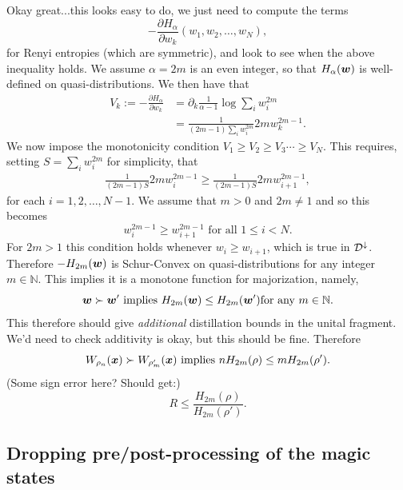 \documentclass[pra,
aps,
twocolumn,
superscriptaddress,
groupedaddress,
nofootinbib,
reprint
]{revtex4-1}
\begin{document}
 Okay great...this looks easy to do, we just need to compute the terms
\begin{equation}
-\frac{\partial H_\alpha}{\partial w_k} (w_1, w_2, \dots, w_N),
\end{equation}
for Renyi entropies (which are symmetric), and look to see when the above inequality holds. 
We assume $ \alpha=2m$ is an even integer, so that $H_\alpha (\boldsymbol{w})$ is well-defined on quasi-distributions. We then have that
\begin{align}
V_k:=-\frac{\partial H_\alpha}{\partial w_k} &= \partial_k \frac{1}{\alpha-1} \log \sum_i w_i^{2m} \\
&= \frac{1}{(2m-1) \sum_i w_i^{2m}}2mw_k^{2m-1}.
\end{align}
We now impose the monotonicity condition $V_1 \ge V_2 \ge V_3 \cdots \ge V_N$. This requires, setting $S= \sum_i w_i^{2m}$ for simplicity, that
\begin{align}
 \frac{1}{(2m-1)S}2mw_i^{2m-1}\ge \frac{1}{(2m-1)S}2mw_{i+1}^{2m-1},
\end{align}
for each $i=1,2,\dots, N-1$. We assume that $m >0$ and $2m \ne 1$ and so this becomes
\begin{equation}
w_i^{2m-1}\ge w_{i+1}^{2m-1}\mbox{ for all } 1 \le i < N.
\end{equation}
For $2m >1$ this condition holds whenever $w_i \ge w_{i+1}$, which is true in ${\mathcal D}^\downarrow$. Therefore $-H_{2m}(\boldsymbol{w})$ is Schur-Convex on quasi-distributions for any integer $m\in \mathbb{N}$. This implies it is a monotone function for majorization, namely,
\begin{equation}
\boldsymbol{w} \succ \boldsymbol{w}' \mbox{ implies } H_{2m} (\boldsymbol{w}) \le H_{2m} (\boldsymbol{w}') \mbox{for any } m \in \mathbb{N}.
\end{equation}
This therefore should give \emph{additional} distillation bounds in the unital fragment. We'd need to check additivity is okay, but this should be fine. Therefore
\begin{equation}
W_{\rho_n}(\boldsymbol{x}) \succ W_{\rho'_m}(\boldsymbol{x}) \mbox{ implies } n H_{2m}(\rho) \le m H_{2m}(\rho'). 
\end{equation}
(Some sign error here? Should get:)
\begin{equation}
R \le \frac{H_{2m}(\rho)}{H_{2m}(\rho')}.
\end{equation}
\subsection{Dropping pre/post-processing of the magic states}
\label{app:cliff_processing}
\end{document}
